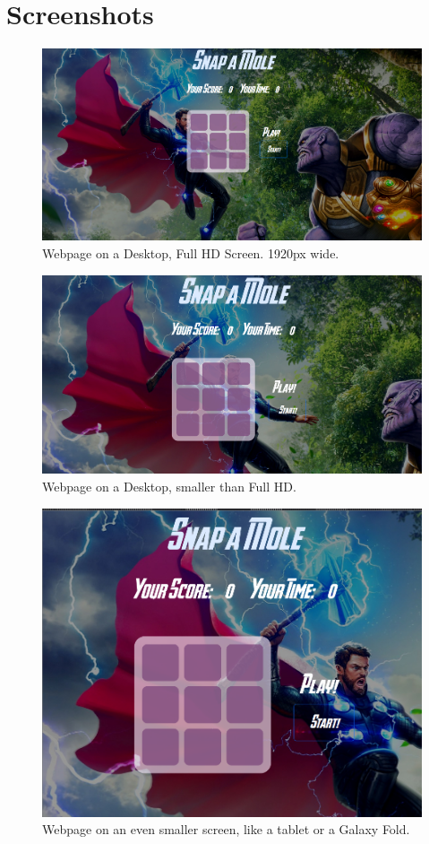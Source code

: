 \documentclass[11pt]{article}
\begin{document}
\section{Screenshots}
\begin{figure}[H]
    \centering
    \includegraphics[width=.95\textwidth]{big.png}
    \caption{Webpage on a Desktop, Full HD Screen. 1920px wide. }
\end{figure}

\begin{figure}[H]
    \centering
    \includegraphics[width=.95\textwidth]{large.png}
    \caption{Webpage on a Desktop, smaller than Full HD. }
\end{figure}

\begin{figure}[H]
    \centering
    \includegraphics[width=.75\textwidth]{mid.png}
    \caption{Webpage on an even smaller screen, like a tablet or a Galaxy Fold. }
\end{figure}
\end{document}
